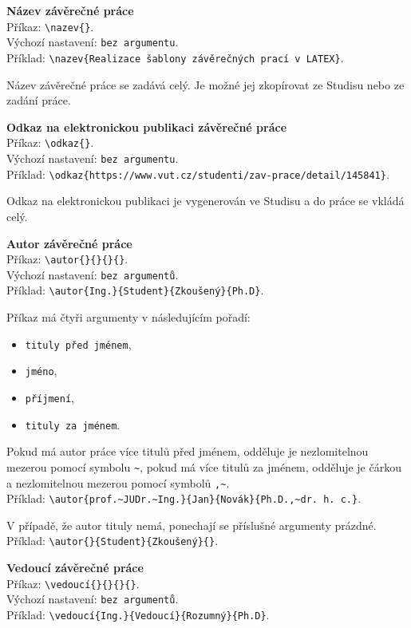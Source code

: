 \vspace{8pt}
\textbf{Název závěrečné práce}\\
Příkaz: \verb|\nazev{}|.\\
Výchozí nastavení: \verb|bez argumentu|.\\
Příklad: \verb|\nazev{Realizace šablony závěrečných prací v LATEX}|.

Název závěrečné práce se zadává celý. Je možné jej zkopírovat ze Studisu nebo ze zadání práce.

\vspace{8pt}
\textbf{Odkaz na elektronickou publikaci závěrečné práce}\\
Příkaz: \verb|\odkaz{}|.\\
Výchozí nastavení: \verb|bez argumentu|.\\
Příklad: \verb|\odkaz{https://www.vut.cz/studenti/zav-prace/detail/145841}|.

Odkaz na elektronickou publikaci je vygenerován ve Studisu a do práce se vkládá celý.

\vspace{8pt}
\textbf{Autor závěrečné práce}\\
Příkaz: \verb|\autor{}{}{}{}|.\\
Výchozí nastavení: \verb|bez argumentů|.\\
Příklad: \verb|\autor{Ing.}{Student}{Zkoušený}{Ph.D}|.

Příkaz má čtyři argumenty v následujícím pořadí:

\begin{itemize}[label={-}]
	\item \verb|tituly před jménem|,
	\item \verb|jméno|,
	\item \verb|příjmení|,
	\item \verb|tituly za jménem|.
\end{itemize}

Pokud má autor práce více titulů před jménem, odděluje je nezlomitelnou mezerou pomocí symbolu \verb|~|, pokud má více titulů za jménem, odděluje je čárkou a nezlomitelnou mezerou pomocí symbolů \verb|,~|.\\
Příklad: \verb|\autor{prof.~JUDr.~Ing.}{Jan}{Novák}{Ph.D.,~dr. h. c.}|.

V případě, že autor tituly nemá, ponechají se příslušné argumenty prázdné.\\
Příklad: \verb|\autor{}{Student}{Zkoušený}{}|.

\newpage
\textbf{Vedoucí závěrečné práce}\\
Příkaz: \verb|\vedoucí{}{}{}{}|.\\
Výchozí nastavení: \verb|bez argumentů|.\\
Příklad: \verb|\vedoucí{Ing.}{Vedoucí}{Rozumný}{Ph.D}|.

